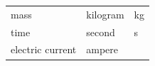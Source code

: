 {\begin{center}
\begin{xtabular*}{\mytablewidth}[t]{|p{10\mystarwidth}|p{10\mystarwidth}|p{10\mystarwidth}|}
    
        mass &
    
    
        kilogram &
    
    
        kg%
     \tabularnewline{}
    
    
        time &
    
    
        second &
    
    
        s%
     \tabularnewline{}
    
    
        electric current &
    
    
        ampere &
    
    

\end{xtabular*}
\end{center}}
